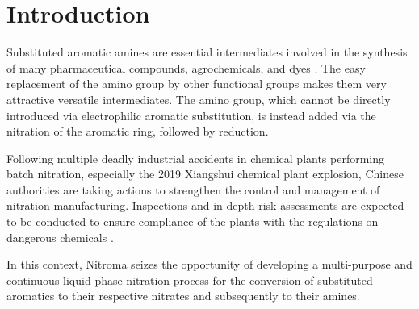 \section{Introduction}
\label{sec:introduction}
\noindent Substituted aromatic amines are essential intermediates involved in the synthesis of many pharmaceutical compounds, agrochemicals, and dyes \cite{vogt_amines_2000}. The easy replacement of the amino group by other functional groups makes them very attractive versatile intermediates. The amino group, which cannot be directly introduced via electrophilic aromatic substitution, is instead added via the nitration of the aromatic ring, followed by reduction.

Following multiple deadly industrial accidents in chemical plants performing batch nitration, especially the 2019 Xiangshui chemical plant explosion, Chinese authorities are taking actions to strengthen the control and management of nitration manufacturing. Inspections and in-depth risk assessments are expected to be conducted to ensure compliance of the plants with the regulations on dangerous chemicals \cite{noauthor_china_2019}. 

In this context, Nitroma seizes the opportunity of developing a multi-purpose and continuous liquid phase nitration process for the conversion of substituted aromatics to their respective nitrates and subsequently to their amines. 

